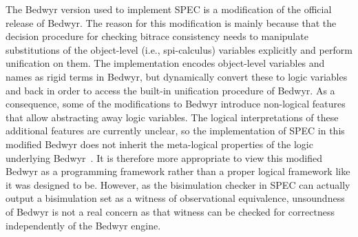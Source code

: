 \documentclass{article}
\begin{document}
The Bedwyr version used to implement SPEC is a modification of
the official release of Bedwyr. The reason for this modification
is mainly because that the decision procedure for checking bitrace consistency
needs to manipulate substitutions of the object-level (i.e., spi-calculus) variables explicitly
and perform unification on them. The implementation encodes object-level
variables and names as rigid terms in Bedwyr, but dynamically convert these to
logic variables and back in order to access the built-in unification procedure
of Bedwyr. As a consequence, some of the modifications to Bedwyr introduce
non-logical features that allow abstracting away logic variables. 
The logical interpretations of these additional features are
currently unclear, so the implementation of SPEC in this modified Bedwyr
does not inherit the meta-logical properties of the logic underlying
Bedwyr~\cite{baelde07cade}. It is therefore more appropriate to view this modified
Bedwyr as a programming framework rather than a proper logical framework
like it was designed to be. However, as the bisimulation checker in SPEC can actually
output a bisimulation set as a witness of observational equivalence, unsoundness
of Bedwyr is not a real concern as that witness can be checked for correctness independently
of the Bedwyr engine. 
\end{document}

